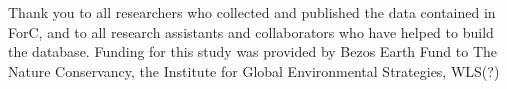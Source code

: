 \documentclass[, manuscript]{copernicus}
\begin{document}



\begin{acknowledgements}
Thank you to all researchers who collected and published the data
contained in ForC, and to all research assistants and collaborators who
have helped to build the database. Funding for this study was provided
by Bezos Earth Fund to The Nature Conservancy, the Institute for Global
Environmental Strategies, WLS(?)
\end{acknowledgements}







\end{document}
